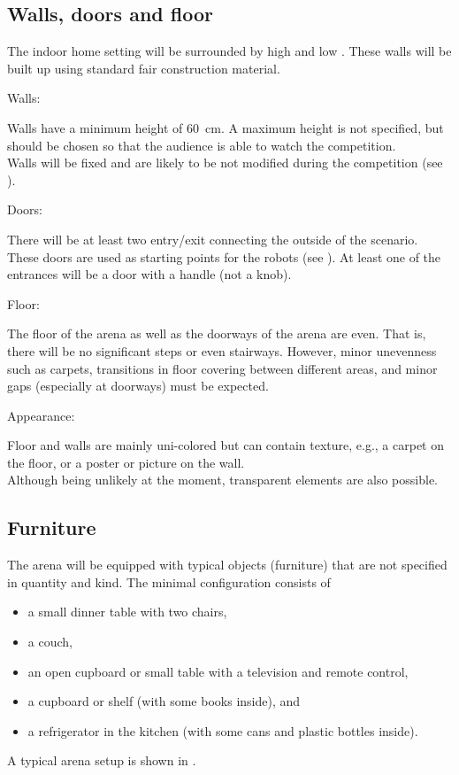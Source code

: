 \subsection{Walls, doors and floor}\label{rule:scenario_walls}

The indoor home setting will be surrounded by high and low .
These walls will be built up using standard fair construction material.

\begin{enumerate}
{\bf\item Walls:} Walls have a minimum height of \SI{60}{\centi\meter}.
  A maximum height is not specified, but should be chosen so that the audience is able to watch the competition.\\
  Walls will be fixed and are likely to be not modified during the competition (see ). 
{\bf\item Doors:} There will be at least two entry/exit  connecting the outside of the scenario.
  These doors are used as starting points for the robots (see ).
  At least one of the entrances will be a door with a handle (not a knob).
{\bf\item Floor:} The floor of the arena as well as the doorways of the arena are even.
  That is, there will be no significant steps or even stairways. 
  However, minor unevenness such as carpets, transitions in floor covering between different areas, 
  and minor gaps (especially at doorways) must be expected.
{\bf\item Appearance:} Floor and walls are mainly uni-colored but can 
  contain texture, e.g., a carpet on the floor, or a poster or picture 
  on the wall.\\
  Although being unlikely at the moment, transparent elements are also possible. 
\end{enumerate}


\subsection{Furniture}\label{rule:scenario_furniture}

The arena will be equipped with typical objects (furniture) that are
not specified in quantity and kind. 
The minimal configuration consists of 
\begin{itemize}
\item a small dinner table with two chairs, 
\item a couch, 
\item an open cupboard or small table with a television and remote control, 
\item a cupboard or shelf (with some books inside), and
\item a refrigerator in the kitchen (with some cans and plastic bottles inside). 
\end{itemize}
A typical arena setup is shown in .

